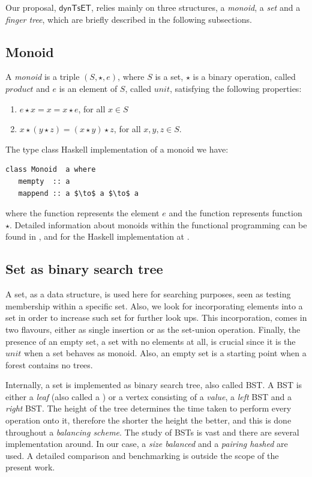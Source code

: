 \documentclass{elsarticle}
\newcommand{\code}[1]{\haskell{#1}}
\newcommand{\MATHSF}[1]{\ensuremath{\mathsf{#1}}\xspace}
\newcommand{\dyntset}{\MATHSF{dynTsET}}
\begin{document}
Our proposal, \dyntset, relies mainly on three structures, a \textit{monoid}, a \textit{set} and a \textit{finger tree}, which are briefly described in the following subsections. 

\subsection{Monoid}

A \textit{monoid} is a triple $(S,\star,e)$, where $S$ is a set, $\star$ is a binary operation, called $product$ and $e$ is an element of $S$, called $unit$, satisfying the following properties:

\begin{enumerate}
\item $e \star x = x = x \star e$, for all $x \in S$ 
\item $x \star (y \star z) = (x \star y) \star z $, for all $x,y,z \in S$.  
\end{enumerate}

The type class Haskell implementation of a monoid we have:
\begin{lstlisting}[mathescape]
class Monoid  a where 
   mempty  :: a
   mappend :: a $\to$ a $\to$ a
\end{lstlisting}   

where the function \code{mempty} represents the element $e$ and the function \code{mappend} represents function $\star$. Detailed information about monoids within the functional programming can be found in \cite{Monoids}, and for the Haskell implementation at \cite{HaskellMonoid}.


\subsection{Set as binary search tree} 

A set, as a data structure, is used here for searching purposes, seen as testing membership within a specific set. Also, we look for incorporating elements into a set in order to increase such set for further look ups. This incorporation, comes in two flavours, either as single insertion or as the set-union operation. Finally, the presence of an empty set, a set with no elements at all, is crucial since it is the $unit$ when a set behaves as monoid. Also, an empty set is a starting point when a forest contains no trees.

Internally, a set is implemented as binary search tree, also called BST. A BST is either a \textit{leaf} (also called a \code{tip}) or a vertex consisting of a \textit{value}, a \textit{left} BST and a \textit{right} BST. The height of the tree determines the time taken to perform every operation onto it, therefore the shorter the height the better, and this is done throughout a \textit{balancing scheme}. The study of BSTs is vast and there are several implementation around. In our case, a \textit{size balanced} and a \textit{pairing hashed} are used. A detailed comparison and benchmarking is outside the scope of the present work.
\end{document}
